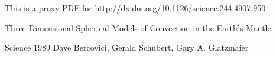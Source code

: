 \documentclass[letterpaper]{article}
\begin{document}
 
This is a proxy PDF for http://dx.doi.org/10.1126/science.244.4907.950

Three-Dimensional Spherical Models of Convection in the Earth's Mantle

Science 1989
Dave Bercovici, Gerald Schubert, Gary A. Glatzmaier
\end{document}
